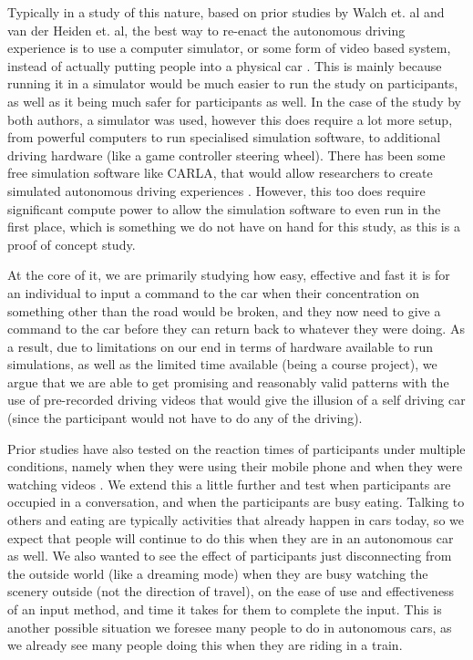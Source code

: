 \documentclass{sigchi}
\begin{document}
Typically in a study of this nature, based on prior studies by Walch et. al and van der Heiden et. al, the best way to re-enact the autonomous driving experience is to use a computer simulator, or some form of video based system, instead of actually putting people into a physical car \cite{vanderHeiden2017} \cite{Walch2016}. This is mainly because running it in a simulator would be much easier to run the study on participants, as well as it being much safer for participants as well. In the case of the study by both authors, a simulator was used, however this does require a lot more setup, from powerful computers to run specialised simulation software, to additional driving hardware (like a game controller steering wheel). There has been some free simulation software like CARLA, that would allow researchers to create simulated autonomous driving experiences \cite{CARLADosovitskiy17}. However, this too does require significant compute power to allow the simulation software to even run in the first place, which is something we do not have on hand for this study, as this is a proof of concept study.

At the core of it, we are primarily studying how easy, effective and fast it is for an individual to input a command to the car when their concentration on something other than the road would be broken, and they now need to give a command to the car before they can return back to whatever they were doing. As a result, due to limitations on our end in terms of hardware available to run simulations, as well as the limited time available (being a course project), we argue that we are able to get promising and reasonably valid patterns with the use of pre-recorded driving videos that would give the illusion of a self driving car (since the participant would not have to do any of the driving).

Prior studies have also tested on the reaction times of participants under multiple conditions, namely when they were using their mobile phone \cite{vanderHeiden2017} and when they were watching videos \cite{Walch2016}. We extend this a little further and test when participants are occupied in a conversation, and when the participants are busy eating. Talking to others and eating are typically activities that already happen in cars today, so we expect that people will continue to do this when they are in an autonomous car as well. We also wanted to see the effect of participants just disconnecting from the outside world (like a dreaming mode) when they are busy watching the scenery outside (not the direction of travel), on the ease of use and effectiveness of an input method, and time it takes for them to complete the input. This is another possible situation we foresee many people to do in autonomous cars, as we already see many people doing this when they are riding in a train.
\end{document}
